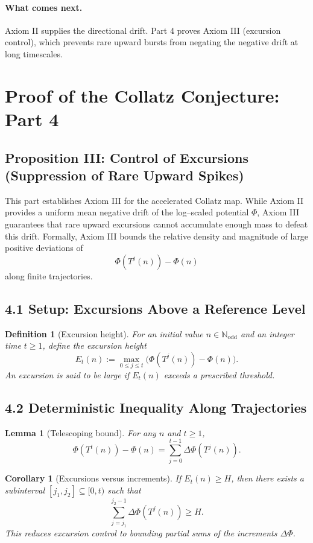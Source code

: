 \documentclass[preprint,12pt]{elsarticle}
\newtheorem{lemma}{Lemma}
\newtheorem{corollary}{Corollary}
\newtheorem{definition}{Definition}
\begin{document}
\paragraph{What comes next.}
Axiom II supplies the directional drift. Part 4 proves Axiom III (excursion control), which prevents rare upward bursts from negating the negative drift at long timescales.

\section{Proof of the Collatz Conjecture: Part 4}
\subsection{Proposition III: Control of Excursions (Suppression of Rare Upward Spikes)}
This part establishes Axiom III for the accelerated Collatz map. While Axiom II provides a uniform mean negative drift of the log–scaled potential \(\Phi\), Axiom III guarantees that rare upward excursions cannot accumulate enough mass to defeat this drift.
Formally, Axiom III bounds the relative density and magnitude of large positive deviations of
\[
\Phi(T^j(n)) - \Phi(n)
\]
along finite trajectories.

\subsection{4.1 Setup: Excursions Above a Reference Level}
\begin{definition}[Excursion height]
For an initial value \(n\in\mathbb{N}_{\mathrm{odd}}\) and an integer time \(t\ge 1\), define the excursion height
\[
E_t(n) := \max_{0\le j\le t} \big( \Phi(T^j(n)) - \Phi(n) \big).
\]
An excursion is said to be large if \(E_t(n)\) exceeds a prescribed threshold.
\end{definition}

\subsection{4.2 Deterministic Inequality Along Trajectories}
\begin{lemma}[Telescoping bound]
For any $n$ and \(t\ge 1\),
\[
\Phi(T^t(n)) - \Phi(n) = \sum_{j=0}^{t-1} \Delta\Phi(T^j(n)).
\]
\end{lemma}

\begin{corollary}[Excursions versus increments]
If \(E_t(n) \ge H\), then there exists a subinterval \([j_1,j_2]\subseteq [0,t)\) such that
\[
\sum_{j=j_1}^{j_2-1} \Delta\Phi(T^j(n)) \ge H.
\]
This reduces excursion control to bounding partial sums of the increments \(\Delta\Phi\).
\end{corollary}
\end{document}
